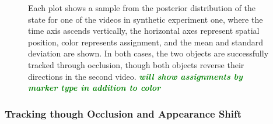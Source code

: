 \documentclass[smallcondensed, final]{svjour3}
\newcommand{\willie}[1]{\textcolor{green}{\textsf{\emph{\textbf{\textcolor{green}{#1}}}}}}
\begin{document}
\begin{figure}
  \centering               
  \caption{Each plot shows a sample from the posterior distribution of the state for one of the videos in synthetic experiment one, where the time axis ascends vertically, the horizontal axes represent spatial position, color represents assignment, and the mean and standard deviation are shown. In both cases, the two objects are successfully tracked through occlusion, though both objects reverse their directions in the second video. \willie{will show assignments by marker type in addition to color}}
  \label{fig:synth_one_plot}
\end{figure}




\subsubsection{Tracking though Occlusion and Appearance Shift}
\end{document}
